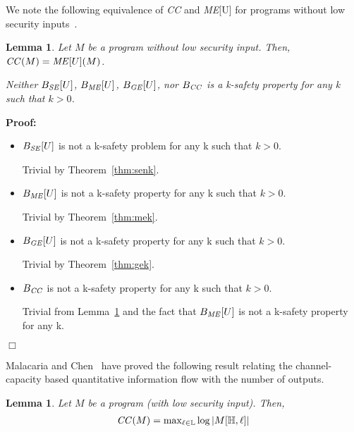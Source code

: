 \documentclass{llncs}
\newtheorem{lemma}[theorem]{Lemma}
\newenvironment{proof}{\noindent\rm{\bf Proof:}}{\hbox{$\Box$}\vspace*{0.2\baselineskip}}
\newenvironment{reftheorem}[1]{\begin{trivlist}\item[\hskip
      \labelsep{\bf Theorem #1.}]\it}{\end{trivlist}}
\begin{document}
We note the following equivalence of {\it CC} and {\it ME}[U] for
programs without low security inputs~\cite{smith09}.
\begin{lemma}
\label{lem:ccme}
Let $M$ be a program without low security input.  Then, 
${\it CC}(M) = {\it  ME}[U](M)$.

\end{lemma}

\begin{reftheorem}{\ref{thm:senk2}}
Neither $B_{\it SE}[U]$, $B_{\it ME}[U]$, $B_{\it GE}[U]$, nor $B_{\it CC}$ is a
k-safety property for any k such that $k > 0$.
\end{reftheorem}
\begin{proof}
\noindent
\begin{itemize}
\item  $B_{\it SE}[U]$ is not a k-safety problem for any k such that
  $k>0$.

Trivial by Theorem~\ref{thm:senk}.

\item  $B_{\it ME}[U]$ is not a k-safety property for any k such that
  $k>0$.

Trivial by Theorem~\ref{thm:mek}.

\item $B_{\it GE}[U]$ is not a k-safety property for any k such that
  $k>0$.

Trivial by Theorem~\ref{thm:gek}.

\item $B_{\it CC}$ is not a k-safety property for any k such that $k>0$.

  Trivial from Lemma~\ref{lem:ccme} and the fact that $B_{\it ME}[U]$
  is not a k-safety property for any k.

\end{itemize}
\end{proof}


Malacaria and Chen~\cite{malacaria08} have proved the following result
relating the channel-capacity based quantitative information flow with
the number of outputs.  
\begin{lemma}
\label{lem:ccloglow}
Let $M$ be a program (with low security input).  Then,
\[
\begin{array}{l}
{\it CC}(M) = 
\max_{\ell\in\mathbb{L}}\log |M[\mathbb{H},\ell]|
\end{array}
\]
\end{lemma}
\end{document}

